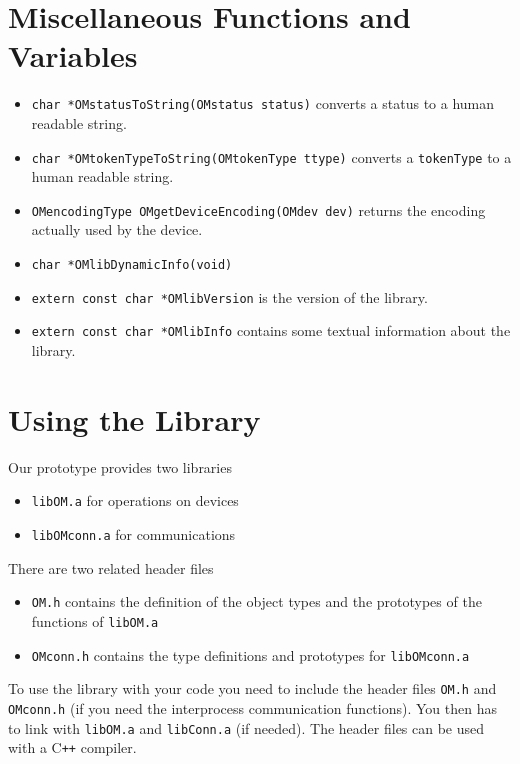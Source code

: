 \documentclass{article}
\begin{document}
\section{Miscellaneous Functions and Variables}

\begin{itemize} 
\item \verb+char *OMstatusToString(OMstatus status)+ converts a status to a
human readable string.
\item \verb+char *OMtokenTypeToString(OMtokenType ttype)+ converts a
{\tt tokenType} to a human readable string.
\item \verb+OMencodingType OMgetDeviceEncoding(OMdev dev)+ returns the
encoding actually used by the device.
\item \verb+char *OMlibDynamicInfo(void)+
\item \verb+extern const char *OMlibVersion+ is the version of the library.
\item \verb+extern const char *OMlibInfo+ contains some textual information
about the library.
\end{itemize} 
%
%

\section{Using the Library}

Our prototype provides two libraries 
\begin{itemize} 
\item {\tt libOM.a} for operations on devices
\item {\tt libOMconn.a} for communications 
\end{itemize} 
There are two related header files 
\begin{itemize} 
\item {\tt OM.h} contains the definition of the object types and
the prototypes of the functions of {\tt libOM.a}
\item {\tt OMconn.h} contains the type definitions and prototypes for 
{\tt libOMconn.a}
\end{itemize} 

To use the library with your code you need to include the header files
{\tt OM.h} and {\tt OMconn.h} (if you need the interprocess communication
functions). You then has to link with {\tt libOM.a} and {\tt libConn.a} (if
needed). The header files can be used with a C\verb-++- compiler.
\end{document}
